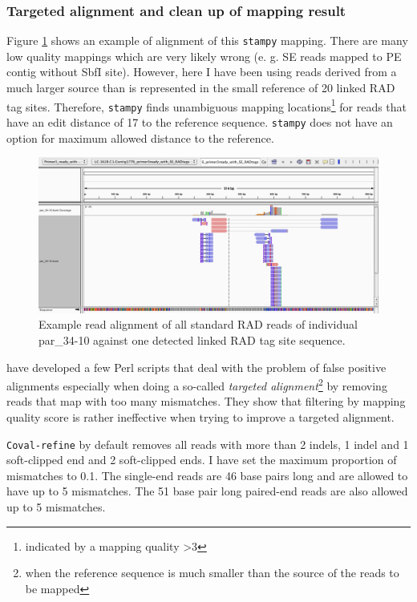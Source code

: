 \documentclass[a4paper,12pt,times,print,index,custombib,custommargin]{PhDThesisPSnPDF}\usepackage[]{graphicx}\usepackage[]{color}
\begin{document}
\subsubsection{Targeted alignment and clean up of mapping result}

Figure \ref{stampy_par_34-10_vs_primer3ready_igv} shows an example of alignment of this \texttt{stampy} mapping. There are many low quality mappings which are very likely wrong (e. g. SE reads mapped to PE contig without SbfI site). However, here I have been using reads derived from a much larger source than is represented in the small reference of 20 \glspl{linked RAD tag site}. Therefore, \texttt{stampy} finds unambiguous mapping locations\footnote{indicated by a mapping quality >3} for reads that have an \gls{edit distance} of 17 to the reference sequence. \texttt{stampy} does not have an option for maximum allowed distance to the reference.

\begin{figure}
\centering
\includegraphics[width=\textwidth]{stampy_par_34-10_vs_primer3ready_igv}
\caption{Example read alignment of all standard RAD reads of individual par\_34-10 against one detected \gls{linked RAD tag site} sequence.}
\label{stampy_par_34-10_vs_primer3ready_igv}
\end{figure}

\cite{Kosugi2013} have developed a few Perl scripts that deal with the problem of false positive alignments especially when doing a so-called \emph{targeted alignment}\footnote{when the reference sequence is much smaller than the source of the reads to be mapped} by removing reads that map with too many mismatches. They show that filtering by mapping quality score is rather ineffective when trying to improve a targeted alignment. 

\texttt{Coval-refine} by default removes all reads with more than 2 \glspl{indel}, 1 indel and 1 soft-clipped end and 2 soft-clipped ends. I have set the maximum proportion of mismatches to 0.1. The single-end reads are 46 base pairs long and are allowed to have up to 5 mismatches. The 51 base pair long paired-end reads are also allowed up to 5 mismatches.
\end{document}
